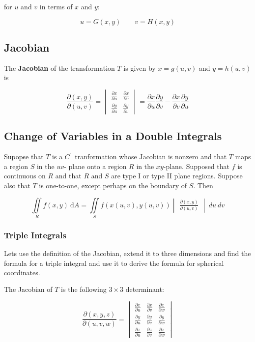 \documentclass{article}
\begin{document}
for $u$ and $v$ in terms of $x$ and $y$:

$$u = G(x,y) \qquad v = H(x,y)$$

\subsection{Jacobian}

The \textbf{Jacobian} of the transformation $T$ is given by $x = g(u,v)$ and $y = h(u,v)$ is 


$$\frac{\partial(x,y)}{\partial(u,v)} = 
\begin{vmatrix}
    \frac{\partial x}{\partial u} & \frac{\partial x}{\partial v} \\[8pt]
    \frac{\partial y}{\partial u} & \frac{\partial y}{\partial v} 
\end{vmatrix} = \frac{\partial x}{\partial u} \frac{\partial y}{\partial v} - \frac{\partial x }{ \partial v} \frac{\partial y}{ \partial u}
$$


\subsection{Change of Variables in a Double Integrals}


Supopse that $T$ is a $C^1$ tranformation whose Jacobian is nonzero and that $T$ maps a region $S$ in the $uv$- plane onto a region $R$ in the $xy$-plane. Supposed that $f$ is continuous on $R$ and that $R$ and $S$ are type I or type II plane regions. Suppose also that $T$ is one-to-one, except perhaps on the boundary of $S$. Then 

$$\iint\limits_{R}f(x,y)\ \mathrm{d}A = \iint\limits_{S}f(x(u,v), y(u,v))\begin{vmatrix}
    \frac{\partial(x,y)}{\partial(u,v)}
\end{vmatrix} \ du \ dv$$

\subsubsection{Triple Integrals}

Lets use the definition of the Jacobian, extend it to three dimensions and find the formula for a triple integral and use it to derive the formula for spherical coordinates.

The Jacobian of $T$ is the following $3 \times 3 $ determinant:

$$\frac{\partial(x,y,z)}{\partial(u,v,w)} = \begin{vmatrix}
    \frac{\partial x}{\partial u} & \frac{\partial x}{\partial v} & \frac{\partial x}{ \partial w} \\[6pt]
    \frac{\partial y}{\partial u} & \frac{\partial y}{ \partial v} & \frac{\partial y}{ \partial w} \\[6pt]
    \frac{\partial z}{ \partial u} & \frac{\partial z }{\partial v} & \frac{\partial z}{ \partial w} 
\end{vmatrix}$$
\end{document}

